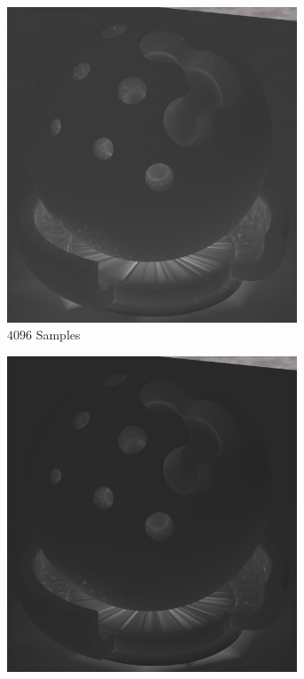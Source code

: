 \begin{figure}[h]
\begin{subfigure}[b]{0.33\textwidth}
				\includegraphics[width=0.95\textwidth]{pic/irr_est-rc-shaderball2-s4096-err.png}
				\caption{$4096$ Samples}
			\end{subfigure}
			\begin{subfigure}[b]{0.33\textwidth}
				\center
				\includegraphics[width=0.95\textwidth]{pic/irr_est-rc-shaderball2-s16384-err.png}

\end{subfigure}
\end{figure}
